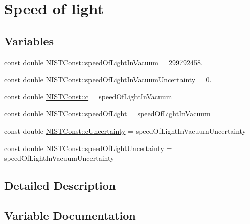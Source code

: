 \hypertarget{group___n_i_s_t_const-_speed_of_light}{}\section{Speed of light}
\label{group___n_i_s_t_const-_speed_of_light}
\subsection*{Variables}
\begin{DoxyCompactItemize}
\item 
const double \hyperlink{group___n_i_s_t_const-_speed_of_light_gacb4a04d9cca33259effabdd28c28e964}{N\+I\+S\+T\+Const\+::speed\+Of\+Light\+In\+Vacuum} = 299792458.
\item 
const double \hyperlink{group___n_i_s_t_const-_speed_of_light_gafb67b7afe777d6e23a70ae69e83542d1}{N\+I\+S\+T\+Const\+::speed\+Of\+Light\+In\+Vacuum\+Uncertainty} = 0.
\item 
const double \hyperlink{group___n_i_s_t_const-_speed_of_light_ga2bd39b3a464ca74134be618ed1cf1798}{N\+I\+S\+T\+Const\+::c} = speed\+Of\+Light\+In\+Vacuum
\item 
const double \hyperlink{group___n_i_s_t_const-_speed_of_light_ga0be1be2f994cccb0cc27bac50f6dd7a3}{N\+I\+S\+T\+Const\+::speed\+Of\+Light} = speed\+Of\+Light\+In\+Vacuum
\item 
const double \hyperlink{group___n_i_s_t_const-_speed_of_light_ga21cb144a81f599986c7d6aff034bf6cb}{N\+I\+S\+T\+Const\+::c\+Uncertainty} = speed\+Of\+Light\+In\+Vacuum\+Uncertainty
\item 
const double \hyperlink{group___n_i_s_t_const-_speed_of_light_ga456f26aa497d53d4b78f7a4d7644c269}{N\+I\+S\+T\+Const\+::speed\+Of\+Light\+Uncertainty} = speed\+Of\+Light\+In\+Vacuum\+Uncertainty
\end{DoxyCompactItemize}


\subsection{Detailed Description}


\subsection{Variable Documentation}
\mbox{\label{group___n_i_s_t_const-_speed_of_light_ga2bd39b3a464ca74134be618ed1cf1798}} 
